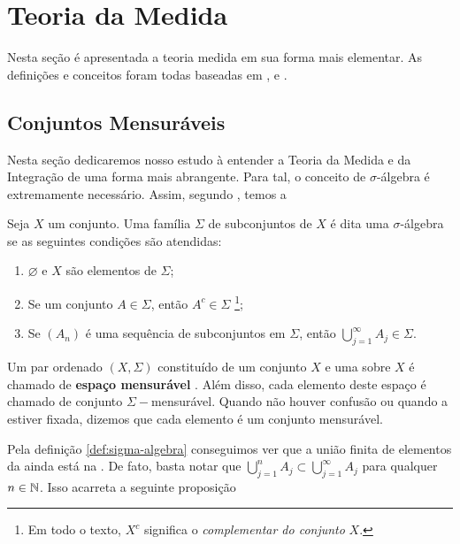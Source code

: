\chapter{Teoria da Medida}

Nesta seção é apresentada a teoria medida em sua forma mais elementar.
As definições e conceitos foram todas baseadas em \cite{elon}, \cite{bartle} e \cite{magalhaes}.

\section{Conjuntos Mensuráveis}
Nesta seção dedicaremos nosso estudo à entender a Teoria da Medida e da Integração de uma forma mais abrangente.
Para tal, o conceito de $\sigma$-álgebra é extremamente necessário. Assim, segundo \cite{bartle}, temos a

\begin{definition}
\label{def:sigma-algebra}

    Seja $X$ um conjunto. Uma família $\Sigma$ de subconjuntos de $X$ é dita uma $\sigma$-álgebra se as seguintes condições são atendidas:
    \begin{enumerate}[label*= (\roman*)]
        \item $\varnothing$ e $X$ são elementos de $\Sigma$;
        
        \item Se um conjunto $A \in \Sigma$, então $A^c \in \Sigma$
        \footnote{Em todo o texto, $X^c$ significa o \textit{complementar do conjunto} $X$.};

        \item Se $(A_n)$ é uma sequência de subconjuntos em $\Sigma$, 
        então $\displaystyle \bigcup_{j = 1}^\infty A_j \in \Sigma$.
    \end{enumerate}

\end{definition}

Um par ordenado $(X, \Sigma)$  constituído de um conjunto $X$ e uma \sigal sobre $X$ é chamado de  \textbf{espaço mensurável} . 
Além disso, cada elemento deste espaço é chamado de conjunto $\Sigma-$mensurável.
Quando não houver confusão ou quando a \sigal estiver fixada, dizemos que cada elemento é um conjunto mensurável.


    Pela definição \ref{def:sigma-algebra} conseguimos ver que a união finita de elementos da \sigal ainda está na \sigal. De fato, basta notar que 
    $\displaystyle \bigcup_{j = 1}^n A_j \subset \displaystyle \bigcup_{j = 1}^\infty A_j$ para qualquer $n \in \operatorname{\mathbb{N}}$.  Isso acarreta a seguinte proposição 

